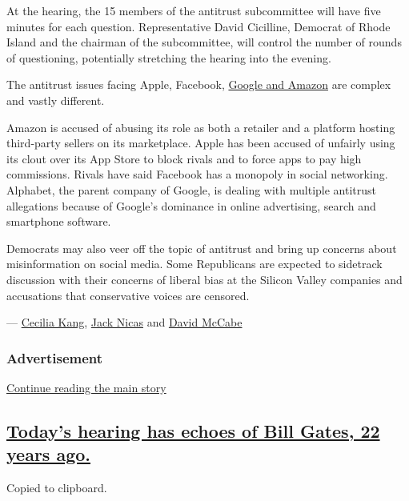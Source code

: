 At the hearing, the 15 members of the antitrust subcommittee will have
five minutes for each question. Representative David Cicilline, Democrat
of Rhode Island and the chairman of the subcommittee, will control the
number of rounds of questioning, potentially stretching the hearing into
the evening.

The antitrust issues facing Apple, Facebook,
\href{https://www.nytimes.com/2019/06/02/business/google-antitrust-investigation.html}{Google
and Amazon} are complex and vastly different.

Amazon is accused of abusing its role as both a retailer and a platform
hosting third-party sellers on its marketplace. Apple has been accused
of unfairly using its clout over its App Store to block rivals and to
force apps to pay high commissions. Rivals have said Facebook has a
monopoly in social networking. Alphabet, the parent company of Google,
is dealing with multiple antitrust allegations because of Google's
dominance in online advertising, search and smartphone software.

Democrats may also veer off the topic of antitrust and bring up concerns
about misinformation on social media. Some Republicans are expected to
sidetrack discussion with their concerns of liberal bias at the Silicon
Valley companies and accusations that conservative voices are censored.

--- \href{https://www.nytimes.com/by/cecilia-kang}{Cecilia Kang},
\href{https://www.nytimes.com/by/jack-nicas}{Jack Nicas} and
\href{https://www.nytimes.com/by/david-mccabe}{David McCabe}

\hypertarget{advertisement-3}{%
\subsubsection{Advertisement}\label{advertisement-3}}

\protect\hyperlink{after-dfp-ad-mid1}{Continue reading the main story}

\hypertarget{todays-hearing-has-echoes-of-bill-gates-22-years-ago}{%
\subsection{\texorpdfstring{\protect\hyperlink{todays-hearing-has-echoes-of-bill-gates-22-years-ago}{Today's
hearing has echoes of Bill Gates, 22 years
ago.}}{Today's hearing has echoes of Bill Gates, 22 years ago.}}\label{todays-hearing-has-echoes-of-bill-gates-22-years-ago}}

Copied to clipboard.

